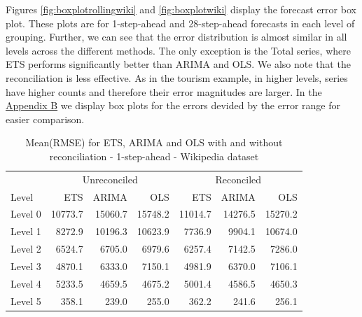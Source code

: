 \documentclass[11pt,a4paper,]{article}
\begin{document}
Figures \ref{fig:boxplotrollingwiki} and \ref{fig:boxplotwiki} display
the forecast error box plot. These plots are for 1-step-ahead and
28-step-ahead forecasts in each level of grouping. Further, we can see
that the error distribution is almost similar in all levels across the
different methods. The only exception is the Total series, where ETS
performs significantly better than ARIMA and OLS. We also note that the
reconciliation is less effective. As in the tourism example, in higher
levels, series have higher counts and therefore their error magnitudes
are larger. In the \protect\hyperlink{appendixB}{Appendix B} we display
box plots for the errors devided by the error range for easier
comparison.

\begin{table}[!h]

\caption{\label{tab:wikipediadataresulrolling}Mean(RMSE) for ETS, ARIMA and OLS with and without reconciliation - 1-step-ahead - Wikipedia dataset}
\centering
\begin{tabular}{lrrrrrr}
\toprule
\multicolumn{1}{c}{} & \multicolumn{3}{c}{Unreconciled} & \multicolumn{3}{c}{Reconciled} \\
\cmidrule(l{2pt}r{2pt}){2-4} \cmidrule(l{2pt}r{2pt}){5-7}
Level & ETS & ARIMA & OLS & ETS & ARIMA & OLS\\
\midrule
Level 0 & 10773.7 & 15060.7 & 15748.2 & 11014.7 & 14276.5 & 15270.2\\
Level 1 & 8272.9 & 10196.3 & 10623.9 & 7736.9 & 9904.1 & 10674.0\\
Level 2 & 6524.7 & 6705.0 & 6979.6 & 6257.4 & 7142.5 & 7286.0\\
Level 3 & 4870.1 & 6333.0 & 7150.1 & 4981.9 & 6370.0 & 7106.1\\
Level 4 & 5233.5 & 4659.5 & 4675.2 & 5001.4 & 4586.5 & 4650.3\\
Level 5 & 358.1 & 239.0 & 255.0 & 362.2 & 241.6 & 256.1\\
\bottomrule
\end{tabular}
\end{table}
\end{document}
